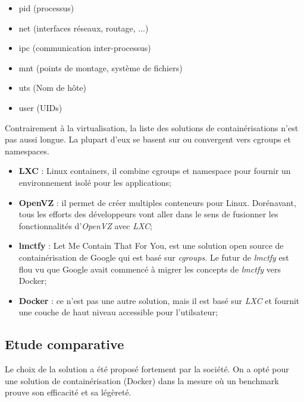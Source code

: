 \begin{onehalfspace}
\begin{itemize}
\begin{itemize}
\item pid (processus)
\item net (interfaces réseaux, routage, ...)
\item ipc (communication inter-processus)
\item mnt (points de montage, système de fichiers)
\item uts (Nom de hôte)
\item user (UIDs)
\end{itemize}

\end{itemize}


Contrairement à la virtualisation, la liste des solutions de containérisations n'est pas aussi longue. La plupart d'eux se basent sur ou convergent vers cgroups et namespaces.

\begin{itemize}
\item \textbf{LXC} : Linux containers,  il combine cgroups et namespace pour fournir un environnement isolé pour les applications;
\item \textbf{OpenVZ} : il  permet de créer multiples conteneurs pour Linux. Dorénavant, tous les efforts des développeurs vont aller dans le sens de fusionner les fonctionnalités d'\emph{OpenVZ} avec \emph{LXC};
\item \textbf{lmctfy} : Let Me Contain That For You, est une solution open source de containérisation de Google qui est basé sur \emph{cgroups}. Le futur de \emph{lmctfy} est flou vu que Google avait commencé à migrer les concepts de \emph{lmctfy} vers Docker;
\item \textbf{Docker} : ce n'est pas une autre solution, mais il est basé sur \emph{LXC} et fournit une couche de haut niveau accessible pour l'utilsateur;

\end{itemize}

\subsection{Etude comparative}

Le choix de la solution a été proposé fortement par la société. On a opté pour une solution de containérisation (Docker) dans la mesure où un benchmark prouve son efficacité et sa légèreté.



\end{onehalfspace}
